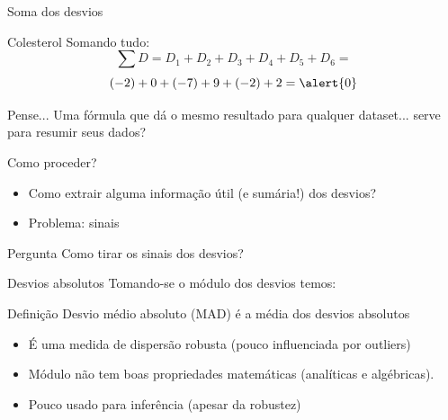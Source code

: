 \documentclass{beamer}
\begin{document}
\begin{frame}{\scriptsize Soma dos desvios}
  \begin{exampleblock}{Colesterol}
    \footnotesize
    Somando tudo:
    \begin{displaymath}
    \sum D = D_1 + D_2 + D_3 + D_4 + D_5 + D_6 =
  \end{displaymath}
  \begin{displaymath}
    (-2) + 0 + (-7) + 9 + (-2) + 2 = \alert{0}
  \end{displaymath}
  \end{exampleblock}
  \bigskip
  \vfill
  \begin{block}{Pense...}
    \footnotesize
    Uma fórmula que dá o mesmo resultado para qualquer dataset... serve para resumir seus dados?
  \end{block}
\end{frame}

\begin{frame}{\scriptsize Como proceder?}
  \begin{itemize}
    \footnotesize
  \item Como extrair alguma informação útil (e sumária!) dos desvios?
  \item Problema: sinais
  \end{itemize}
  \bigskip
  \vfill
  \begin{block}{Pergunta}
    \footnotesize
    Como tirar os sinais dos desvios?
  \end{block}
\end{frame}

\begin{frame}{\scriptsize Desvios absolutos}
  \scriptsize
  Tomando-se o módulo dos desvios temos:

  \bigskip
  \begin{block}{Definição}
    \footnotesize
    Desvio médio absoluto (MAD) é a média dos desvios absolutos
  \end{block}

  \bigskip
  \begin{itemize}
    \scriptsize
  \item É uma medida de dispersão robusta (pouco influenciada por
    outliers)
    \medskip
  \item Módulo não tem boas propriedades matemáticas (analíticas e
    algébricas).
    \medskip
  \item Pouco usado para inferência (apesar da robustez)
  \end{itemize}
\end{frame}
\end{document}
